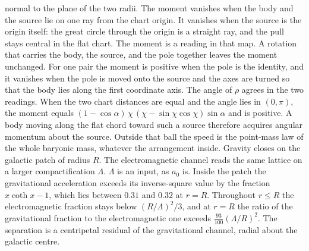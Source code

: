 \documentclass[a4paper]{article}
\begin{document}
normal to the plane of the two radii. The moment vanishes when the body and the source lie on one ray from the chart origin. It vanishes when the source is the origin itself: the great circle through the origin is a straight ray, and the pull stays central in the flat chart. The moment is a reading in that map. A rotation that carries the body, the source, and the pole together leaves the moment unchanged. For one pair the moment is positive when the pole is the identity, and it vanishes when the pole is moved onto the source and the axes are turned so that the body lies along the first coordinate axis. The angle of $\rho$ agrees in the two readings. When the two chart distances are equal and the angle lies in $(0,\pi)$, the moment equals $(1-\cos\alpha)\,\chi\,(\chi-\sin\chi\cos\chi)\sin\alpha$ and is positive. A body moving along the flat chord toward such a source therefore acquires angular momentum about the source. Outside that ball the speed is the point-mass law of the whole baryonic mass, whatever the arrangement inside. Gravity closes on the galactic patch of radius \(R\). The electromagnetic channel reads the same lattice on a larger compactification \(\Lambda\). \(\Lambda\) is an input, as \(a_0\) is. Inside the patch the gravitational acceleration exceeds its inverse-square value by the fraction \(x\coth x-1\), which lies between \(0.31\) and \(0.32\) at \(r=R\). Throughout \(r\le R\) the electromagnetic fraction stays below \((R/\Lambda)^2/3\), and at \(r=R\) the ratio of the gravitational fraction to the electromagnetic one exceeds \(\frac{93}{100}(\Lambda/R)^2\). The separation is a centripetal residual of the gravitational channel, radial about the galactic centre.
\end{document}
